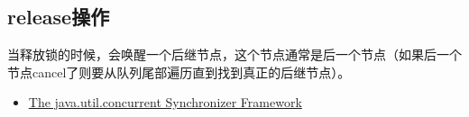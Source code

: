 \documentclass[12pt]{article}
\begin{document}
\begin{Shaded}
\begin{Highlighting}[]
  \OperatorTok{(} \OperatorTok{)} \OperatorTok{\{}
     \OperatorTok{(;;)} \OperatorTok{\{}
        \OperatorTok{=}\OperatorTok{;}
         \OperatorTok{(}\OperatorTok{==} \OperatorTok{)} \OperatorTok{\{}
             \OperatorTok{(}\OperatorTok{(} \OperatorTok{()))}
\OperatorTok{=}\OperatorTok{;}
        \OperatorTok{\}}  \OperatorTok{\{}
 \OperatorTok{=}\OperatorTok{;}
             \OperatorTok{(}\OperatorTok{(}\OperatorTok{,}\OperatorTok{))} \OperatorTok{\{}
 \OperatorTok{=}\OperatorTok{;}
                \OperatorTok{;}
            \OperatorTok{\}}
        \OperatorTok{\}}
    \OperatorTok{\}}
\OperatorTok{\}}
\end{Highlighting}
\end{Shaded}

\subsection{release操作}\label{releaseux64cdux4f5c}

当释放锁的时候，会唤醒一个后继节点，这个节点通常是后一个节点（如果后一个节点cancel了则要从队列尾部遍历直到找到真正的后继节点）。

\begin{Shaded}
\begin{Highlighting}[]
   \OperatorTok{(}\OperatorTok{)} \OperatorTok{\{}
     \OperatorTok{(}\OperatorTok{(}\OperatorTok{))} \OperatorTok{\{}
        \OperatorTok{=}\OperatorTok{;}
         \OperatorTok{(}\OperatorTok{!=}  \OperatorTok{\&\&} \OperatorTok{!=} \OperatorTok{)}
            \OperatorTok{(}\OperatorTok{);}
         \OperatorTok{;}
    \OperatorTok{\}}
     \OperatorTok{;}
\OperatorTok{\}}
\end{Highlighting}
\end{Shaded}

\begin{itemize}
\tightlist
\item
  \href{http://gee.cs.oswego.edu/dl/papers/aqs.pdf}{The java.util.concurrent Synchronizer Framework}
\end{itemize}
\end{document}
